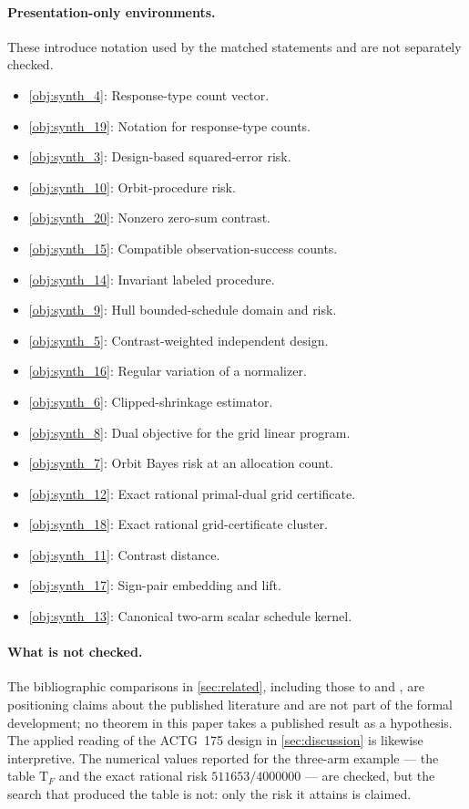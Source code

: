 \documentclass[11pt]{article}
\begin{document}
\paragraph{Presentation-only environments.} These introduce notation used by the matched statements and are not separately checked.
\begin{itemize}\setlength{\itemsep}{0pt}
\item \cref{obj:synth_4}: Response-type count vector.
\item \cref{obj:synth_19}: Notation for response-type counts.
\item \cref{obj:synth_3}: Design-based squared-error risk.
\item \cref{obj:synth_10}: Orbit-procedure risk.
\item \cref{obj:synth_20}: Nonzero zero-sum contrast.
\item \cref{obj:synth_15}: Compatible observation-success counts.
\item \cref{obj:synth_14}: Invariant labeled procedure.
\item \cref{obj:synth_9}: Hull bounded-schedule domain and risk.
\item \cref{obj:synth_5}: Contrast-weighted independent design.
\item \cref{obj:synth_16}: Regular variation of a normalizer.
\item \cref{obj:synth_6}: Clipped-shrinkage estimator.
\item \cref{obj:synth_8}: Dual objective for the grid linear program.
\item \cref{obj:synth_7}: Orbit Bayes risk at an allocation count.
\item \cref{obj:synth_12}: Exact rational primal-dual grid certificate.
\item \cref{obj:synth_18}: Exact rational grid-certificate cluster.
\item \cref{obj:synth_11}: Contrast distance.
\item \cref{obj:synth_17}: Sign-pair embedding and lift.
\item \cref{obj:synth_13}: Canonical two-arm scalar schedule kernel.
\end{itemize}

\paragraph{What is not checked.} The bibliographic comparisons in \cref{sec:related}, including those to \citet{sudijono_dobriban_tchetgen_2026_sharp} and \citet{hull_2026_bounded}, are positioning claims about the published literature and are not part of the formal development; no theorem in this paper takes a published result as a hypothesis. The applied reading of the ACTG~175 design in \cref{sec:discussion} is likewise interpretive. The numerical values reported for the three-arm example --- the table \(\mathrm T_F\) and the exact rational risk \(511653/4000000\) --- are checked, but the search that produced the table is not: only the risk it attains is claimed.
\end{document}
